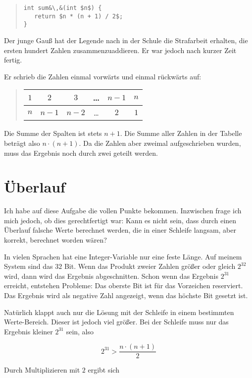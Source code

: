 \documentclass[a5paper,landscape,ngerman,10pt]{article}
\begin{document}
\begin{quotation}
\begin{lstlisting}
int sum&\,&(int $n$) {
   return $n * (n + 1) / 2$;
}
\end{lstlisting}
\end{quotation}

Der junge Gauß hat der Legende nach in der Schule die
Strafarbeit erhalten, die ersten hundert Zahlen
zusammenzuaddieren.
Er war jedoch nach kurzer Zeit fertig.

Er schrieb die Zahlen einmal vorwärts und einmal rückwärts auf:

\begin{quotation}
\begin{tabular}{c|c|c|c|c|c}
$1$&$2$&$3$&\ldots&$n-1$&$n$\\
\hline
$n$&$n-1$&$n-2$&\ldots&$2$&$1$
\end{tabular}
\end{quotation}

Die Summe der Spalten ist stets $n+1$.
Die Summe aller Zahlen in der Tabelle beträgt also $n\cdot(n+1)$.
Da die Zahlen aber zweimal aufgeschrieben wurden, muss das
Ergebnis noch durch zwei geteilt werden.

\section{Überlauf}

Ich habe auf diese Aufgabe die vollen Punkte bekommen.
Inzwischen frage ich mich jedoch, ob dies gerechtfertigt war:
Kann es nicht sein, dass durch einen Überlauf falsche Werte
berechnet werden, die in einer Schleife langsam, aber korrekt,
berechnet worden wären?

In vielen Sprachen hat eine Integer-Variable nur eine feste
Länge.
Auf meinem System sind das $32$ Bit.
Wenn das Produkt zweier Zahlen größer oder gleich $2^{32}$
wird, dann wird das Ergebnis abgeschnitten.
Schon wenn das Ergebnis $2^{31}$ erreicht, entstehen Probleme:
Das oberste Bit ist für das Vorzeichen reserviert.
Das Ergebnis wird als negative Zahl angezeigt, wenn das
höchste Bit gesetzt ist.

Natürlich klappt auch nur die Lösung mit der Schleife in einem
bestimmten Werte-Bereich.
Dieser ist jedoch viel größer.
Bei der Schleife muss nur das Ergebnis kleiner $2^{31}$ sein,
also

\[2^{31} > \frac{n\cdot(n + 1)}2\]

Durch Multiplizieren mit $2$ ergibt sich
\end{document}
